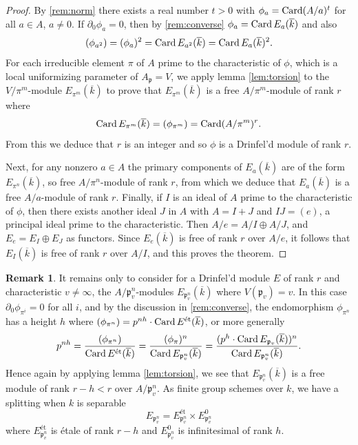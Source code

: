 \documentclass[12pt,a4paper]{article}
\theoremstyle{plain}
\theoremstyle{definition}
\newtheorem{remark}{Remark}[section]
\theoremstyle{remark}
\DeclareMathOperator{\Card}{Card}
\newcommand{\fp}{\mathfrak{p}}
\let\deg\relax
\providecommand{\fp}{\mathfrak{p}}
\begin{document}
\begin{proof}
By \eqref{rem:norm} there exists a real number $t > 0$ with $\deg \phi_a = \Card(A/a)^t$ for all $a \in A$, $a \neq 0$. If $\partial_0 \phi_a = 0$, then by \eqref{rem:converse} $\deg \phi_a = \Card E_a(\overline{k})$ and also
\[
\deg(\phi_{a^2}) = \deg(\phi_a)^2 = \Card E_{a^2}(\overline{k}) = \Card E_a(\overline{k})^2.
\]
For each irreducible element $\pi$ of $A$ prime to the characteristic of $\phi$, which is a local uniformizing parameter of $A_\fp = V$, we apply lemma \eqref{lem:torsion} to the $V/\pi^m$-module $E_{\pi^m}(\overline{k})$ to prove that $E_{\pi^m}(\overline{k})$ is a free $A/\pi^m$-module of rank $r$ where
\[
\Card E_{\pi^m}(\overline{k}) = \deg(\phi_{\pi^m}) = \Card(A/\pi^m)^r.
\]
From this we deduce that $r$ is an integer and so $\phi$ is a Drinfel'd module of rank $r$.

Next, for any nonzero $a \in A$ the primary components of $E_a(\overline{k})$ are of the form $E_{\pi^n}(\overline{k})$, so free $A/\pi^n$-module of rank $r$, from which we deduce that $E_a(\overline{k})$ is a free $A/a$-module of rank $r$. Finally, if $I$ is an ideal of $A$ prime to the characteristic of $\phi$, then there exists another ideal $J$ in $A$ with $A = I + J$ and $IJ = (e)$, a principal ideal prime to the characteristic. Then $A/e = A/I \oplus A/J$, and $E_e = E_I \oplus E_J$ as functors. Since $E_e(\overline{k})$ is free of rank $r$ over $A/e$, it follows that $E_I(\overline{k})$ is free of rank $r$ over $A/I$, and this proves the theorem.
\end{proof}

\begin{remark}
\label{rem:singular}
It remains only to consider for a Drinfel'd module $E$ of rank $r$ and characteristic $v \neq \infty$, the $A/\fp_v^n$-modules $E_{\fp_v^n}(\overline{k})$ where $V(\fp_v) = v$. In this case $\partial_0 \phi_{\pi^i} = 0$ for all $i$, and by the discussion in \eqref{rem:converse}, the endomorphism $\phi_{\pi^n}$ has a height $h$ where $\deg(\phi_{\pi^n}) = p^{nh} \cdot \Card E^{\text{\'et}}(\overline{k})$, or more generally
\[
p^{nh} = \frac{\deg(\phi_{\pi^n})}{\Card E^{\text{\'et}}(\overline{k})} = \frac{(\deg \phi_\pi)^n}{\Card E_{\fp_v^n}(\overline{k})} = \frac{(p^h \cdot \Card E_{\fp_v}(\overline{k}))^n}{\Card E_{\fp_v^n}(\overline{k})}.
\]
Hence again by applying lemma \eqref{lem:torsion}, we see that $E_{\fp_v^n}(\overline{k})$ is a free module of rank $r - h < r$ over $A/\fp_v^n$. As finite group schemes over $k$, we have a splitting when $k$ is separable
\[
E_{\fp_v^n} = E_{\fp_v^n}^{\text{\'et}} \times E_{\fp_v^n}^0
\]
where $E_{\fp_v^n}^{\text{\'et}}$ is \'etale of rank $r - h$ and $E_{\fp_v^n}^0$ is infinitesimal of rank $h$.
\end{remark}
\end{document}
